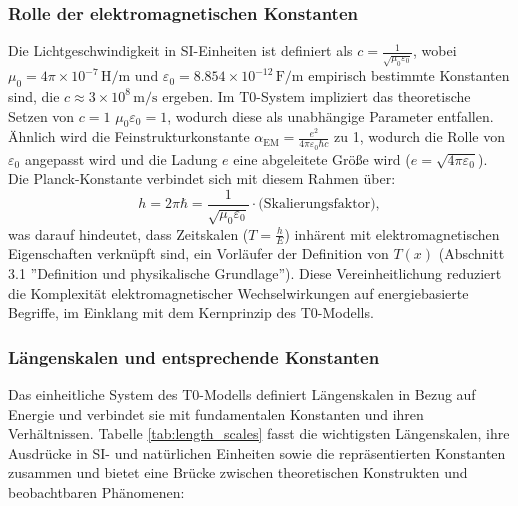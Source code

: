 \documentclass[12pt,a4paper]{article}
\newcommand{\Tfield}{T(x)}
\newcommand{\alphaEM}{\alpha_{\text{EM}}}
\begin{document}
	\subsubsection{Rolle der elektromagnetischen Konstanten}
	Die Lichtgeschwindigkeit in SI-Einheiten ist definiert als \(c = \frac{1}{\sqrt{\mu_0\varepsilon_0}}\), wobei \(\mu_0 = 4\pi \times 10^{-7} \, \text{H/m}\) und \(\varepsilon_0 = 8.854 \times 10^{-12} \, \text{F/m}\) empirisch bestimmte Konstanten sind, die \(c \approx 3 \times 10^8 \, \text{m/s}\) ergeben. Im T0-System impliziert das theoretische Setzen von \(c = 1\) \(\mu_0\varepsilon_0 = 1\), wodurch diese als unabhängige Parameter entfallen. Ähnlich wird die Feinstrukturkonstante \(\alphaEM = \frac{e^2}{4\pi\varepsilon_0\hbar c}\) zu 1, wodurch die Rolle von \(\varepsilon_0\) angepasst wird und die Ladung \(e\) eine abgeleitete Größe wird (\(e = \sqrt{4\pi\varepsilon_0}\)). Die Planck-Konstante verbindet sich mit diesem Rahmen über:
	\begin{equation}
		h = 2\pi\hbar = \frac{1}{\sqrt{\mu_0\varepsilon_0}} \cdot \text{(Skalierungsfaktor)},
		\label{eq:planck_em}
	\end{equation}
	was darauf hindeutet, dass Zeitskalen (\(T = \frac{h}{E}\)) inhärent mit elektromagnetischen Eigenschaften verknüpft sind, ein Vorläufer der Definition von \(\Tfield\) (Abschnitt 3.1 ''Definition und physikalische Grundlage''). Diese Vereinheitlichung reduziert die Komplexität elektromagnetischer Wechselwirkungen auf energiebasierte Begriffe, im Einklang mit dem Kernprinzip des T0-Modells.
	
	\subsubsection{Längenskalen und entsprechende Konstanten}
	\label{subsec:length_scales}
	
	Das einheitliche System des T0-Modells definiert Längenskalen in Bezug auf Energie und verbindet sie mit fundamentalen Konstanten und ihren Verhältnissen. Tabelle \ref{tab:length_scales} fasst die wichtigsten Längenskalen, ihre Ausdrücke in SI- und natürlichen Einheiten sowie die repräsentierten Konstanten zusammen und bietet eine Brücke zwischen theoretischen Konstrukten und beobachtbaren Phänomenen:
	
\end{document}
